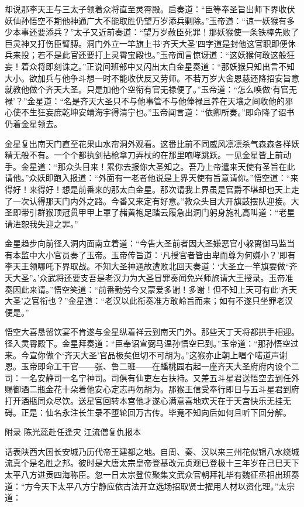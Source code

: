 \documentclass[12pt,UTF8]{ctexbook}
\begin{document}
却说那李天王与三太子领着众将直至灵霄殿。启奏道：“臣等奉圣旨出师下界收伏妖仙孙悟空不期他神通广大不能取胜仍望万岁添兵剿除。”玉帝道：“谅一妖猴有多少本事还要添兵？”太子又近前奏道：“望万岁赦臣死罪！那妖猴使一条铁棒先败了巨灵神又打伤臣臂膊。洞门外立一竿旗上书‘齐天大圣’四字道是封他这官职即便休兵来投；若不是此官还要打上灵霄宝殿也。”玉帝闻言惊讶道：“这妖猴何敢这般狂妄！着众将即刻诛之。”正说间班部中又闪出太白金星奏道：“那妖猴只知出言不知大小。欲加兵与他争斗想一时不能收伏反又劳师。不若万岁大舍恩慈还降招安旨意就教他做个齐天大圣。只是加他个空衔有官无禄便了。”玉帝道：“怎么唤做‘有官无禄’？”金星道：“名是齐天大圣只不与他事管不与他俸禄且养在天壤之间收他的邪心使不生狂妄庶乾坤安靖海宇得清宁也。”玉帝闻言道：“依卿所奏。”即命降了诏书仍着金星领去。

金星复出南天门直至花果山水帘洞外观看。这番比前不同威风凛凛杀气森森各样妖精无般不有。一个个都执剑拈枪拿刀弄杖的在那里咆哮跳跃。一见金星皆上前动手。金星道：“那众头目来！累你去报你大圣知之。吾乃上帝遣来天使有圣旨在此请他。”众妖即跑入报道：“外面有一老者他说是上界天使有旨意请你。”悟空道：“来得好！来得好！想是前番来的那太白金星。那次请我上界虽是官爵不堪却也天上走了一次认得那天门内外之路。今番又来定有好意。”教众头目大开旗鼓摆队迎接。大圣即带引群猴顶冠贯甲甲上罩了赭黄袍足踏云履急出洞门躬身施礼高叫道：“老星请进恕我失迎之罪。”

金星趋步向前径入洞内面南立着道：“今告大圣前者因大圣嫌恶官小躲离御马监当有本监中大小官员奏了玉帝。玉帝传旨道：‘凡授官者皆由卑而尊为何嫌小？’即有李天王领哪吒下界取战。不知大圣神通故遭败北回天奏道：‘大圣立一竿旗要做“齐天大圣”。’众武将还要支吾是老汉力为大圣冒罪奏闻免兴师旅请大王授录。玉帝准奏因此来请。”悟空笑道：“前番勤劳今又蒙爱多谢！多谢！但不知上天可有此‘齐天大圣’之官衔也？”金星道：“老汉以此衔奏准方敢岭旨而来；如有不遂只坐罪老汉便是。”

悟空大喜恳留饮宴不肯遂与金星纵着祥云到南天门外。那些天丁天将都拱手相迎。径入灵霄殿下。金星拜奏道：“臣奉诏宣弼马温孙悟空已到。”玉帝道：“那孙悟空过来。今宣你做个‘齐天大圣’官品极矣但切不可胡为。”这猴亦止朝上唱个喏道声谢恩。玉帝即命工干官——张、鲁二班——在蟠桃园右起一座齐天大圣府府内设个二司：一名安静司一名宁神司。司俱有仙吏左右扶持。又差五斗星君送悟空去到任外赐御酒二瓶金花十朵着他安心定志再勿胡为。那猴王信受奉行即日与五斗星君到府打开酒瓶同众尽饮。送星官回转本宫他才遂心满意喜地欢天在于天宫快乐无挂无碍。正是：仙名永注长生录不堕轮回万古传。毕竟不知向后如何且听下回分解。





附录 陈光蕊赴任逢灾 江流僧复仇报本

话表陕西大国长安城乃历代帝王建都之地。自周、秦、汉以来三州花似锦八水绕城流真个是名胜之邦。彼时是大唐太宗皇帝登基改元贞观已登极十三年岁在己巳天下太平八方进贡四海称臣。忽一日太宗登位聚集文武众官朝拜礼毕有魏征丞相出班奏道：“方今天下太平八方宁静应依古法开立选场招取贤士擢用人材以资化理。”太宗道：
\end{document}
